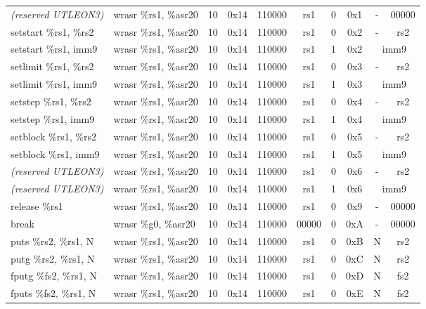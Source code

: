 \documentclass[a4paper,11pt]{article}
\newcommand{\leon}{UTLEON3}
\newcommand{\res}{\normalfont \emph{(reserved \leon)}}
\begin{document}
\begin{table}
\begin{center}
{\begin{tabular}{|>{\ttfamily}l|>{\ttfamily}l||c|c|c|c|c|c|c|c|}
\hline \hline
\res                  & wrasr \%rs1, \%asr20 & 10 & 0x14 & 110000 &  rs1 & 0 & 0x1 & - & 00000 \\
setstart \%rs1, \%rs2 & wrasr \%rs1, \%asr20 & 10 & 0x14 & 110000 &  rs1 & 0 & 0x2 & - & rs2 \\ \cline{9-10}
setstart \%rs1,  imm9 & wrasr \%rs1, \%asr20 & 10 & 0x14 & 110000 &  rs1 & 1 & 0x2 & \multicolumn{2}{c|}{imm9} \\ \cline{9-10}
setlimit \%rs1, \%rs2 & wrasr \%rs1, \%asr20 & 10 & 0x14 & 110000 &  rs1 & 0 & 0x3 & - & rs2 \\ \cline{9-10}
setlimit \%rs1,  imm9 & wrasr \%rs1, \%asr20 & 10 & 0x14 & 110000 &  rs1 & 1 & 0x3 & \multicolumn{2}{c|}{imm9} \\ \cline{9-10}
setstep  \%rs1, \%rs2 & wrasr \%rs1, \%asr20 & 10 & 0x14 & 110000 &  rs1 & 0 & 0x4 & - & rs2 \\ \cline{9-10}
setstep  \%rs1,  imm9 & wrasr \%rs1, \%asr20 & 10 & 0x14 & 110000 &  rs1 & 1 & 0x4 & \multicolumn{2}{c|}{imm9} \\ \cline{9-10}
setblock \%rs1, \%rs2 & wrasr \%rs1, \%asr20 & 10 & 0x14 & 110000 &  rs1 & 0 & 0x5 & - & rs2 \\ \cline{9-10}
setblock \%rs1,  imm9 & wrasr \%rs1, \%asr20 & 10 & 0x14 & 110000 &  rs1 & 1 & 0x5 & \multicolumn{2}{c|}{imm9} \\ \cline{9-10}
\res                  & wrasr \%rs1, \%asr20 & 10 & 0x14 & 110000 &  rs1 & 0 & 0x6 & - & rs2 \\ \cline{9-10}
\res                  & wrasr \%rs1, \%asr20 & 10 & 0x14 & 110000 &  rs1 & 1 & 0x6 & \multicolumn{2}{c|}{imm9} \\ \cline{9-10}
release \%rs1         & wrasr \%rs1, \%asr20 & 10 & 0x14 & 110000 &  rs1 & 0 & 0x9 & - & 00000 \\
break                 & wrasr \%g0, \%asr20  & 10 & 0x14 & 110000 & 00000 & 0 & 0xA & - & 00000 \\
puts \%rs2, \%rs1, N  & wrasr \%rs1, \%asr20 & 10 & 0x14 & 110000 &  rs1 & 0 & 0xB & N & rs2 \\
putg \%rs2, \%rs1, N  & wrasr \%rs1, \%asr20 & 10 & 0x14 & 110000 &  rs1 & 0 & 0xC & N & rs2 \\
fputg \%fs2, \%rs1, N & wrasr \%rs1, \%asr20 & 10 & 0x14 & 110000 &  rs1 & 0 & 0xD & N & fs2 \\
fputs \%fs2, \%rs1, N & wrasr \%rs1, \%asr20 & 10 & 0x14 & 110000 &  rs1 & 0 & 0xE & N & fs2 \\


\end{tabular}}
\end{center}
\end{table}
\end{document}
